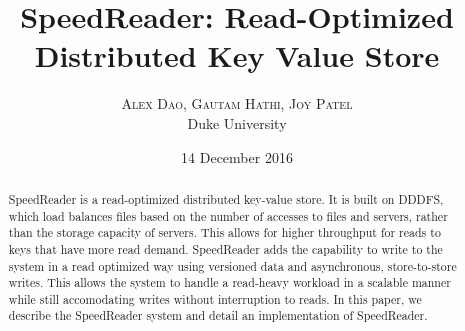 \documentclass[twoside]{article}
\title{\vspace{-15mm}\fontsize{24pt}{10pt}\selectfont\textbf{SpeedReader: Read-Optimized Distributed Key Value Store}} %
\author{
\large
\textsc{Alex Dao, Gautam Hathi, Joy Patel}\\[2mm] %
\normalsize Duke University \\ %
\vspace{-5mm}
}
\date{14 December 2016}
\begin{document}
\maketitle %

\thispagestyle{fancy} %


\begin{abstract}

\noindent SpeedReader is a read-optimized distributed key-value store. It is built on DDDFS, which load balances files based on the number of accesses to files and servers, rather than the storage capacity of servers. This allows for higher throughput for reads to keys that have more read demand. SpeedReader adds the capability to write to the system in a read optimized way using versioned data and asynchronous, store-to-store writes. This allows the system to handle a read-heavy workload in a scalable manner while still accomodating writes without interruption to reads. In this paper, we describe the SpeedReader system and detail an implementation of SpeedReader.

\end{abstract}

\end{document}
